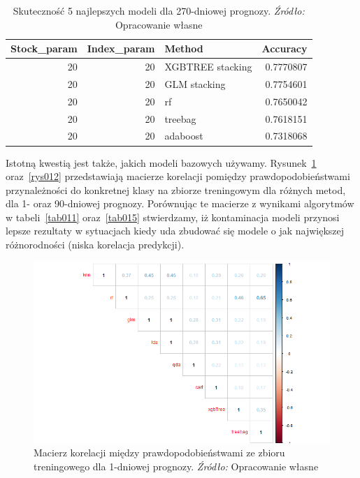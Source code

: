 \documentclass[12pt,a4paper,twoside,openany]{book}
\begin{document}
\begin{table}[ht]
\caption{Skuteczność 5 najlepszych modeli dla 270-dniowej prognozy. \textit{Źródło:} Opracowanie własne}
\label{tab016}
\centering
\begin{tabular}{rrlr}
  \hline
Stock\_param & Index\_param & Method & Accuracy \\ 
  \hline
      20 &       20 & XGBTREE stacking & 0.7770807 \\ 
        20 &       20 & GLM stacking & 0.7754601 \\ 
        20 &       20 & rf & 0.7650042 \\ 
        20 &       20 & treebag & 0.7618151 \\ 
        20 &       20 & adaboost & 0.7318068 \\ 
   \hline
\end{tabular}
\end{table}

Istotną kwestią jest także, jakich modeli bazowych używamy. Rysunek~\ref{rys011} oraz~\ref{rys012} przedstawiają macierze korelacji pomiędzy prawdopodobieństwami przynależności do konkretnej klasy na zbiorze treningowym dla różnych metod, dla 1- oraz 90-dniowej prognozy. Porównując te macierze z wynikami algorytmów w tabeli~\ref{tab011} oraz~\ref{tab015} stwierdzamy, iż kontaminacja modeli przynosi lepsze rezultaty w sytuacjach kiedy uda zbudować się modele o jak największej różnorodności (niska korelacja predykcji).


\begin{figure}
\centering
\includegraphics[scale=0.5]{./rys011}
\caption{Macierz korelacji między prawdopodobieństwami ze zbioru treningowego dla 1-dniowej prognozy. \textit{Źródło:} Opracowanie własne}\label{rys011}
\end{figure}
\end{document}
